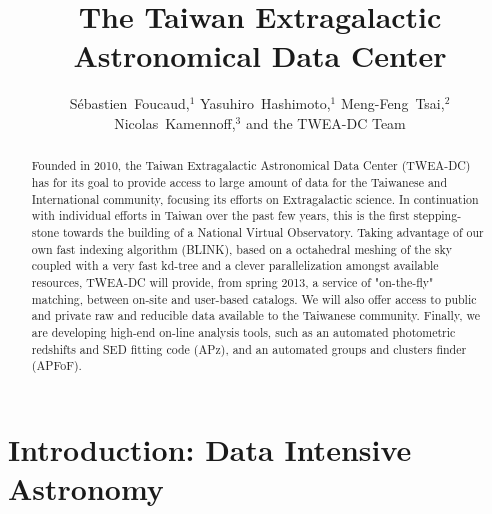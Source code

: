 
\resetcounters





\title{The Taiwan Extragalactic Astronomical Data Center}
\author{S\'ebastien~Foucaud,$^1$ Yasuhiro~Hashimoto,$^1$ Meng-Feng~Tsai,$^2$ Nicolas~Kamennoff,$^3$ and the TWEA-DC Team
}


\begin{abstract}
Founded in 2010, the Taiwan Extragalactic Astronomical Data Center (TWEA-DC) has for its goal to provide access to large amount of data for the Taiwanese and International community, focusing its efforts on Extragalactic science. In continuation with individual efforts in Taiwan over the past few years, this is the first stepping-stone towards the building of a National Virtual Observatory.  Taking advantage of our own fast indexing algorithm (BLINK), based on a octahedral meshing of the sky coupled with a very fast kd-tree and a clever parallelization amongst available resources, TWEA-DC will provide, from spring 2013, a service of "on-the-fly" matching, between on-site and user-based catalogs.  We will also offer access to public and private raw and reducible data available to the Taiwanese community.  
Finally, we are developing high-end on-line analysis tools, such as an automated photometric redshifts and SED fitting code (APz), and an automated groups and clusters finder (APFoF).
\end{abstract}


\section{Introduction: Data Intensive Astronomy}

